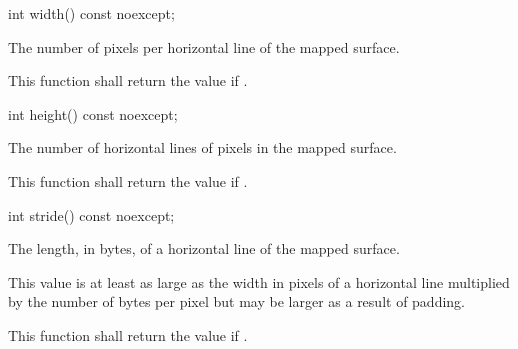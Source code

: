 \begin{itemdecl}
int width() const noexcept;
\end{itemdecl}
\begin{itemdescr}
\pnum
\returns
The number of pixels per horizontal line of the mapped surface.

\pnum
\remarks
This function shall return the value  if .
\end{itemdescr}

\begin{itemdecl}
int height() const noexcept;
\end{itemdecl}
\begin{itemdescr}
\pnum
\returns
The number of horizontal lines of pixels in the mapped surface.

\pnum
\remarks
This function shall return the value  if .
\end{itemdescr}

\begin{itemdecl}
int stride() const noexcept;
\end{itemdecl}
\begin{itemdescr}
\pnum
\returns
The length, in bytes, of a horizontal line of the mapped surface.
\begin{note}
This value is at least as large as the width in pixels of a horizontal line multiplied by the number of bytes per pixel but may be larger as a result of padding.
\end{note}

\pnum
\remarks
This function shall return the value  if .
\end{itemdescr}
